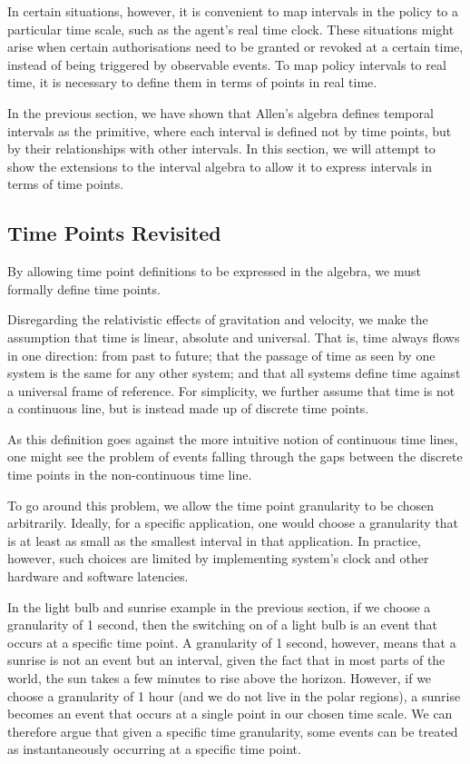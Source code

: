 \documentclass[11pt]{report}
\begin{document}
      In certain situations, however, it is convenient to map intervals in the
      policy to a particular time scale, such as the agent's real time clock.
      These situations might arise when certain authorisations need to be
      granted or revoked at a certain time, instead of being triggered by
      observable events. To map policy intervals to real time, it is necessary
      to define them in terms of points in real time.

      In the previous section, we have shown that Allen's algebra defines
      temporal intervals as the primitive, where each interval is defined not
      by time points, but by their relationships with other intervals. In this
      section, we will attempt to show the extensions to the interval algebra
      to allow it to express intervals in terms of time points.

      \subsection{Time Points Revisited}

        By allowing time point definitions to be expressed in the algebra, we must
        formally define time points.

        Disregarding the relativistic effects of gravitation and velocity, we make the
        assumption that time is linear, absolute and universal. That is, time always
        flows in one direction: from past to future; that the passage of time as seen
        by one system is the same for any other system; and that all systems define
        time against a universal frame of reference. For simplicity, we further assume
        that time is not a continuous line, but is instead made up of discrete time
        points.

        As this definition goes against the more intuitive notion of continuous time
        lines, one might see the problem of events falling through the gaps between
        the discrete time points in the non-continuous time line.

        To go around this problem, we allow the time point granularity to be chosen
        arbitrarily. Ideally, for a specific application, one would choose a
        granularity that is at least as small as the smallest interval in that
        application. In practice, however, such choices are limited by implementing
        system's clock and other hardware and software latencies.

        In the light bulb and sunrise example in the previous section, if we
        choose a granularity of 1 second, then the switching on of a light bulb is an
        event that occurs at a specific time point. A granularity of 1 second,
        however, means that a sunrise is not an event but an interval, given the fact
        that in most parts of the world, the sun takes a few minutes to rise above the
        horizon. However, if we choose a granularity of 1 hour (and we do not
        live in the polar regions), a sunrise becomes an event that occurs at a single
        point in our chosen time scale. We can therefore argue that given a specific
        time granularity, some events can be treated as instantaneously occurring at a
        specific time point.
\end{document}
